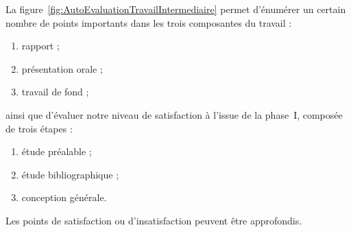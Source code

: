 \documentclass[11pt, french]{report-rd-info}
\begin{document}
La figure~\ref{fig:AutoEvaluationTravailIntermediaire} permet d'énumérer un certain nombre de points importants dans les trois composantes du travail :
\begin{enumerate}
   \item rapport ;
   \item présentation orale ;
   \item travail de fond ;
\end{enumerate}
ainsi que d'évaluer notre niveau de satisfaction à l'issue de la phase~I, composée de trois étapes :
\begin{enumerate}
	\item étude préalable ;
	\item étude bibliographique ;
	\item conception générale.
\end{enumerate}

Les points de satisfaction ou d'insatisfaction peuvent être approfondis.
\end{document}
